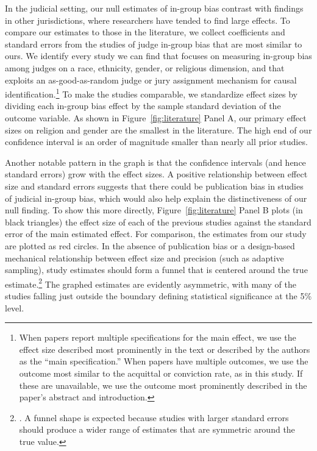 \documentclass[12pt,english]{article}
\begin{document}
In the judicial setting, our null estimates of in-group bias contrast with findings in other jurisdictions, where researchers have tended to find large effects. To compare our estimates to those in the literature, we collect coefficients and standard errors from the studies of judge in-group bias that are most similar to ours. We identify every study we can find that focuses on measuring in-group bias among judges on a race, ethnicity, gender, or religious dimension, and that exploits an as-good-as-random judge or jury assignment mechanism for causal identification.\footnote{When papers report multiple specifications for the main effect, we use the effect size described most prominently in the text or described by the authors as the ``main specification.'' When papers have multiple outcomes, we use the outcome most similar to the acquittal or conviction rate, as in this study. If these are unavailable, we use the outcome most prominently described in the paper's abstract and introduction.} To make the studies comparable, we standardize effect sizes by dividing each in-group bias effect by the sample standard deviation of the outcome variable.  As shown in Figure~\ref{fig:literature} Panel A, our primary effect sizes on religion and gender are the smallest in the literature.  The high end of our confidence interval is an order of magnitude smaller than nearly all prior studies.

Another notable pattern in the graph is that the confidence intervals (and hence standard errors) grow with the effect sizes. A positive relationship between effect size and standard errors suggests that there could be publication bias in studies of judicial in-group bias, which would also help explain the distinctiveness of our null finding. To show this more directly, Figure~\ref{fig:literature} Panel B plots (in black triangles) the effect size of each of the previous studies against the standard error of the main estimated effect. For comparison, the estimates from our study are plotted as red circles. In the absence of publication bias or a design-based mechanical relationship between effect size and precision (such as adaptive sampling), study estimates should form a funnel that is centered around the true estimate.\footnote{ \citealp[See][]{egger1997bias,gerber2001testing,levine2009sample,slavin2009relationship,kuhberger2014publication,andrews2019bias}. A funnel shape is expected because studies with larger standard errors should produce a wider range of estimates that are symmetric around the true value.} The graphed estimates are evidently asymmetric, with many of the studies falling just outside the boundary defining statistical significance at the 5\% level.
\end{document}
